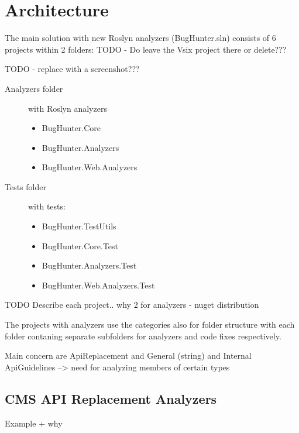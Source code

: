 \documentclass[
  digital, %
  table,   %
  lof,     %
  lot,     %
  oneside,
]{fithesis3}
\begin{document}
\section{Architecture}
The main solution with new Roslyn analyzers (BugHunter.sln) consists of 6 projects within 2 folders: TODO - Do leave the Vsix project there or delete???

TODO - replace with a screenshot???
\begin{description}
  \item[Analyzers folder] with Roslyn analyzers
  \begin{itemize}
    \item BugHunter.Core
    \item BugHunter.Analyzers
    \item BugHunter.Web.Analyzers
  \end{itemize}
  
  \item[Tests folder] with tests:
  \begin{itemize}
    \item BugHunter.TestUtils
    \item BugHunter.Core.Test
    \item BugHunter.Analyzers.Test
    \item BugHunter.Web.Analyzers.Test
  \end{itemize}
\end{description}

TODO Describe each project.. why 2 for analyzers - nuget distribution

The projects with analyzers use the categories also for folder structure with each folder contaning separate subfolders for analyzers and code fixes respectively.


Main concern are ApiReplacement and General (string) and Internal ApiGuidelines --> need for analyzing members of certain types

\subsection{CMS API Replacement Analyzers}
Example + why
\end{document}
